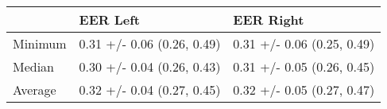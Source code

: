 \begin{tabular}{lll}
\toprule
{} &                    EER Left &                   EER Right \\
\midrule
Minimum &  0.31 +/- 0.06 (0.26, 0.49) &  0.31 +/- 0.06 (0.25, 0.49) \\
Median  &  0.30 +/- 0.04 (0.26, 0.43) &  0.31 +/- 0.05 (0.26, 0.45) \\
Average &  0.32 +/- 0.04 (0.27, 0.45) &  0.32 +/- 0.05 (0.27, 0.47) \\
\bottomrule
\end{tabular}
